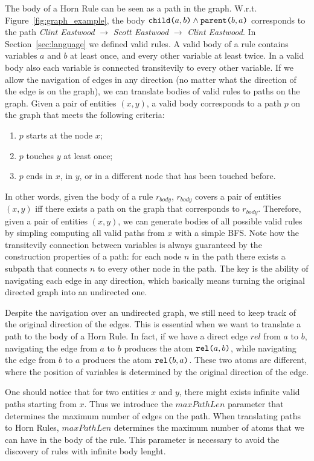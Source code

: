 The body of a Horn Rule can be seen as a path in the graph. W.r.t. Figure~\ref{fig:graph_example}, the body $\texttt{child(}a,b\texttt{)} \wedge \texttt{parent(}b,a\texttt{)}$ corresponds to the path \textit{Clint Eastwood} $\rightarrow$ \textit{Scott Eastwood} $\rightarrow$ \textit{Clint Eastwood}. In Section~\ref{sec:language} we defined valid rules. A valid body of a rule contains variables $a$ and $b$ at least once, and every other variable at least twice. 
In a valid body also each variable is connected transitevily to every other variable. 
If we allow the navigation of edges in any direction (no matter what the direction of the edge is on the graph), we can translate bodies of valid rules to paths on the graph.
Given a pair of entities $(x,y)$, a valid body corresponds to a path $p$ on the graph that meets the following criteria:
\begin{enumerate}
	\item $p$ starts at the node $x$;
	\item $p$ touches $y$ at least once;
	\item $p$ ends in $x$, in $y$, or in a different node that has been touched before.
\end{enumerate}
In other words, given the body of a rule $r_{body}$, $r_{body}$ covers a pair of entities $(x,y)$ iff there exists a path on the graph that corresponds to $r_{body}$. Therefore, given a pair of entities $(x,y)$, we can generate bodies of all possible valid rules by simpling computing all valid paths from $x$ with a simple BFS. Note how the transitevily connection between variables is always guaranteed by the construction properties of a path: for each node $n$ in the path there exists a subpath that connects $n$ to every other node in the path. The key is the ability of navigating each edge in any direction, which basically means turning the original directed graph into an undirected one.

Despite the navigation over an undirected graph, we still need to keep track of the original direction of the edges. This is essential when we want to translate a path to the body of a Horn Rule. In fact, if we have a direct edge $rel$ from $a$ to $b$, navigating the edge from $a$ to $b$ produces the atom $\texttt{rel(}a,b\texttt{)}$, while navigating the edge from $b$ to $a$ produces the atom $\texttt{rel(}b,a\texttt{)}$. These two atoms are different, where the position of variables is determined by the original direction of the edge.

One should notice that for two entities $x$ and $y$, there might exists infinite valid paths starting from $x$. Thus we introduce the $maxPathLen$ parameter that determines the maximum number of edges on the path. When translating paths to Horn Rules, $maxPathLen$ determines the maximum number of atoms that we can have in the body of the rule. This parameter is necessary to avoid the discovery of rules with infinite body lenght.

